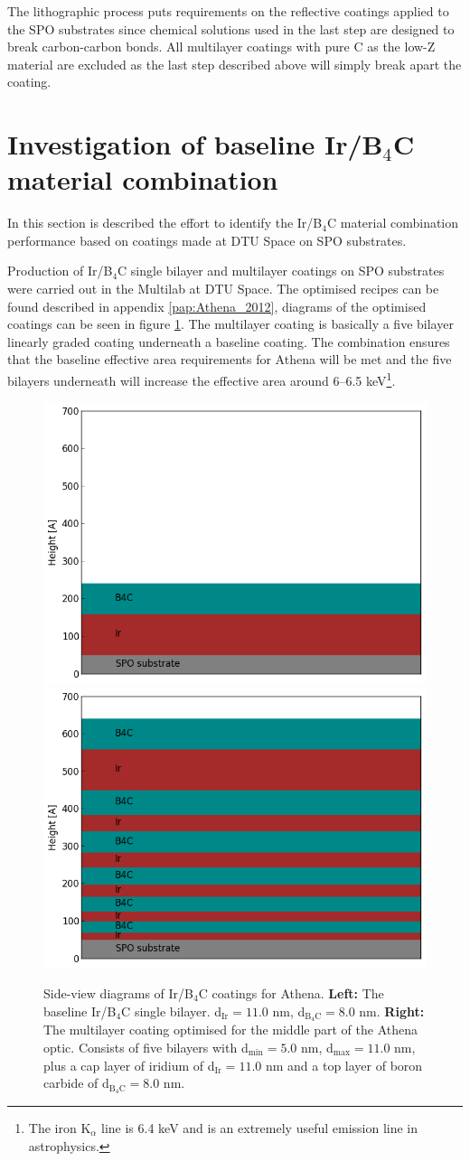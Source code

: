 The lithographic process puts requirements on the reflective coatings applied to the SPO substrates since chemical solutions used in the last step are designed to break carbon-carbon bonds. All multilayer coatings with pure C as the low-Z material are excluded as the last step described above will simply break apart the coating.

\newpage
\section{Investigation of baseline Ir/B$_4$C material combination}
In this section is described the effort to identify the Ir/B$_4$C material combination performance based on coatings made at DTU Space on SPO substrates.

Production of Ir/B$_4$C single bilayer and multilayer coatings on SPO substrates were carried out in the Multilab at DTU Space. The optimised recipes can be found described in appendix \ref{pap:Athena_2012}, diagrams of the optimised coatings can be seen in figure \ref{fig:ml_baseline_sideview}. The multilayer coating is basically a five bilayer linearly graded coating underneath a baseline coating. The combination ensures that the baseline effective area requirements for Athena will be met and the five bilayers underneath will increase the effective area around 6--6.5 keV\footnote{The iron K$_{\alpha}$ line is 6.4 keV and is an extremely useful emission line in astrophysics.}.

\begin{figure}[!h]
  \center
\includegraphics[width=0.4\linewidth]{figures/athena/coating_on_spo/ir-b4c-baseline.png}
  \includegraphics[width=0.4\linewidth]{figures/athena/coating_on_spo/ir-b4c-ml.png}
\caption{\footnotesize Side-view diagrams of Ir/B$_4$C coatings for Athena. \textbf{Left:} The baseline Ir/B$_4$C single bilayer. d$_{\text{Ir}} = 11.0$ nm,  d$_{\text{B}_4\text{C}} = 8.0$ nm. \textbf{Right:} The multilayer coating optimised for the middle part of the Athena optic. Consists of five bilayers with d$_{\text{min}} = 5.0$ nm, d$_{\text{max}} = 11.0$ nm, plus a cap layer of iridium of d$_{\text{Ir}} = 11.0$ nm and a top layer of boron carbide of d$_{\text{B}_4\text{C}} = 8.0$ nm. }\label{fig:ml_baseline_sideview}
\end{figure}

